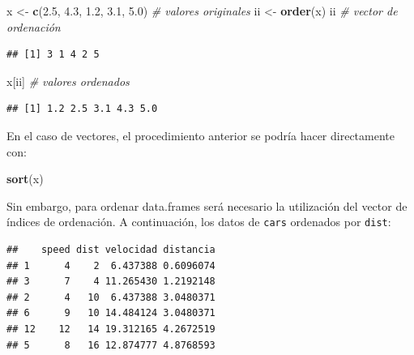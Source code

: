\documentclass[
]{book}
\newenvironment{Shaded}{\begin{snugshade}}{\end{snugshade}}
\newcommand{\CommentTok}[1]{\textcolor[rgb]{0.56,0.35,0.01}{\textit{#1}}}
\newcommand{\FloatTok}[1]{\textcolor[rgb]{0.00,0.00,0.81}{#1}}
\newcommand{\KeywordTok}[1]{\textcolor[rgb]{0.13,0.29,0.53}{\textbf{#1}}}
\newcommand{\NormalTok}[1]{#1}
\newcommand{\OperatorTok}[1]{\textcolor[rgb]{0.81,0.36,0.00}{\textbf{#1}}}
\newcommand{\StringTok}[1]{\textcolor[rgb]{0.31,0.60,0.02}{#1}}
\begin{document}
\begin{Shaded}
\begin{Highlighting}[]
\NormalTok{x <-}\StringTok{ }\KeywordTok{c}\NormalTok{(}\FloatTok{2.5}\NormalTok{, }\FloatTok{4.3}\NormalTok{, }\FloatTok{1.2}\NormalTok{, }\FloatTok{3.1}\NormalTok{, }\FloatTok{5.0}\NormalTok{) }\CommentTok{# valores originales}
\NormalTok{ii <-}\StringTok{ }\KeywordTok{order}\NormalTok{(x)}
\NormalTok{ii    }\CommentTok{# vector de ordenación}
\end{Highlighting}
\end{Shaded}

\begin{verbatim}
## [1] 3 1 4 2 5
\end{verbatim}

\begin{Shaded}
\begin{Highlighting}[]
\NormalTok{x[ii] }\CommentTok{# valores ordenados}
\end{Highlighting}
\end{Shaded}

\begin{verbatim}
## [1] 1.2 2.5 3.1 4.3 5.0
\end{verbatim}

En el caso de vectores, el procedimiento anterior se podría
hacer directamente con:

\begin{Shaded}
\begin{Highlighting}[]
\KeywordTok{sort}\NormalTok{(x)}
\end{Highlighting}
\end{Shaded}

Sin embargo, para ordenar data.frames será necesario la utilización del
vector de índices de ordenación. A continuación, los datos de \texttt{cars}
ordenados por \texttt{dist}:

\begin{Shaded}
\end{Shaded}

\begin{verbatim}
##    speed dist velocidad distancia
## 1      4    2  6.437388 0.6096074
## 3      7    4 11.265430 1.2192148
## 2      4   10  6.437388 3.0480371
## 6      9   10 14.484124 3.0480371
## 12    12   14 19.312165 4.2672519
## 5      8   16 12.874777 4.8768593
\end{verbatim}
\end{document}
